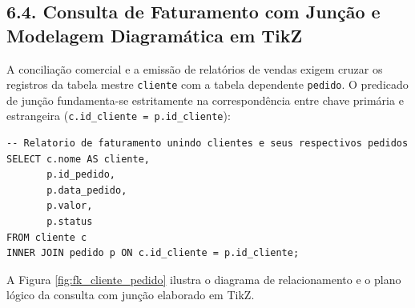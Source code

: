 \subsection*{6.4. Consulta de Faturamento com Junção e Modelagem Diagramática em TikZ}

A conciliação comercial e a emissão de relatórios de vendas exigem cruzar os registros da tabela mestre \texttt{cliente} com a tabela dependente \texttt{pedido}. O predicado de junção fundamenta-se estritamente na correspondência entre chave primária e estrangeira (\texttt{c.id\_cliente = p.id\_cliente}):

\begin{lstlisting}
-- Relatorio de faturamento unindo clientes e seus respectivos pedidos
SELECT c.nome AS cliente,
       p.id_pedido,
       p.data_pedido,
       p.valor,
       p.status
FROM cliente c
INNER JOIN pedido p ON c.id_cliente = p.id_cliente;
\end{lstlisting}

A Figura \ref{fig:fk_cliente_pedido} ilustra o diagrama de relacionamento e o plano lógico da consulta com junção elaborado em TikZ.

